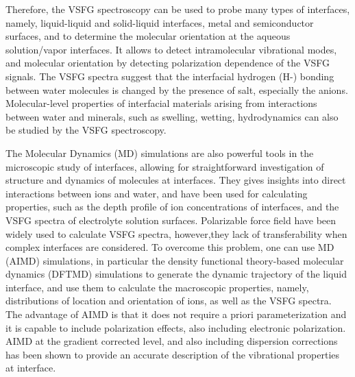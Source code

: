 Therefore, the VSFG spectroscopy can be used to probe many types of interfaces, namely, liquid-liquid and 
solid-liquid interfaces\cite{Guyot-Sionnest1987,RS91,DuQ1993,DuQ1994,Richmond2002,Gopalakrishnan2006,ShenYR2006,Morita2008}, metal and semiconductor surfaces\cite{Harris87,Superfine88},
and to determine the molecular orientation at the aqueous solution/vapor interfaces.
It allows to detect intramolecular vibrational modes, and molecular orientation by detecting polarization dependence of the VSFG signals\cite{Vidal05}.  
The VSFG spectra suggest that the interfacial hydrogen (H-) bonding between water molecules is changed by the presence of salt, 
especially the anions\cite{EAR04}.
Molecular-level properties of interfacial materials arising from interactions between water and minerals, 
such as swelling, wetting, hydrodynamics can also be studied by the VSFG spectroscopy\cite{Rotenberg14}.

The Molecular Dynamics (MD) simulations are also powerful tools in the microscopic study of interfaces,
allowing for straightforward investigation of structure and dynamics of molecules at interfaces\cite{Morita2008}.
They gives insights into direct interactions between ions and water, and have been used for calculating properties, 
such as the depth profile of ion concentrations of interfaces\cite{Jungwirth2001,Jungwirth2002}, and the VSFG spectra 
of electrolyte solution surfaces\cite{Gopalakrishnan2006,Johnson2014,Ishiyama2014,Ishiyama2017}.
Polarizable force field have been widely used to calculate VSFG spectra\cite{LXD03,MKP04,TI07,MM05}, however,they lack
of transferability when complex interfaces are considered.
To overcome this problem, one can use \abinitio MD (AIMD) simulations\cite{CP1985,Pastore1991,Hutter2012}, 
in particular the density functional theory-based molecular dynamics (DFTMD) simulations\cite{CP1985,Nagata2015,Nagata2016,Kuehne2020} to generate the dynamic trajectory of 
the liquid interface, and use them to calculate the macroscopic properties, namely, distributions of location and
orientation of ions, as well as the VSFG spectra\cite{Sulpizi2013,Usui2015,Ohto2015,Khatib2016}.  
The advantage of AIMD is that it does not require a priori parameterization and it is capable to include polarization effects\cite{Ufimtsev2011},
also including electronic polarization. AIMD at the gradient corrected level, and also including dispersion corrections\cite{Grimme2004,Grimme2006,Grimme2007,Grimme2010,Baer2011}
has been shown to provide an accurate description of the vibrational properties at interface\cite{Fornaro2015}.

